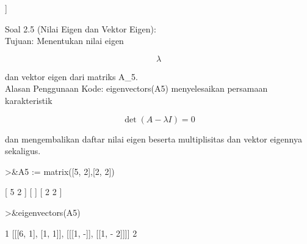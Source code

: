 \documentclass[a4paper,10pt]{article}
\begin{document}
\begin{eulernotebook}
\begin{euleroutput}
                        [[x = 2, y = 3, z = - 1]]
  
\end{euleroutput}
\begin{eulercomment}
Soal 2.5 (Nilai Eigen dan Vektor Eigen):\\
Tujuan: Menentukan nilai eigen \\
\end{eulercomment}
\begin{eulerformula}
\[
\lambda 
\]
\end{eulerformula}
\begin{eulercomment}
dan vektor eigen dari matriks A\_5.\\
Alasan Penggunaan Kode: eigenvectors(A5) menyelesaikan persamaan
karakteristik \\
\end{eulercomment}
\begin{eulerformula}
\[
\det(A - \lambda I) = 0 
\]
\end{eulerformula}
\begin{eulercomment}
dan mengembalikan daftar nilai eigen beserta multiplisitas dan vektor
eigennya sekaligus.
\end{eulercomment}
\begin{eulerprompt}
>&A5 := matrix([5, 2],[2, 2])
\end{eulerprompt}
\begin{euleroutput}
  
                                 [ 5  2 ]
                                 [      ]
                                 [ 2  2 ]
  
\end{euleroutput}
\begin{eulerprompt}
>&eigenvectors(A5)
\end{eulerprompt}
\begin{euleroutput}
  
                                         1
                [[[6, 1], [1, 1]], [[[1, -]], [[1, - 2]]]]
                                         2
  

\end{euleroutput}
\end{eulernotebook}
\end{document}
